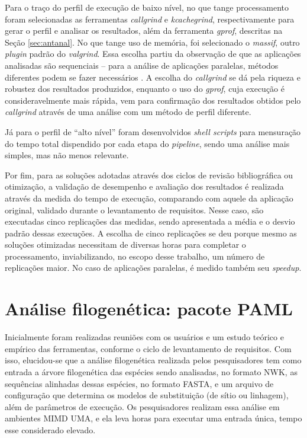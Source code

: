 \documentclass[cic,tc]{iiufrgs}
\begin{document}
Para o traço do perfil de execução de baixo nível, no que tange processamento
foram selecionadas as ferramentas \textit{callgrind} e \textit{kcachegrind}, respectivamente para
gerar o perfil e analisar os resultados, além da ferramenta \textit{gprof}, descritas na Seção
\ref{sec:antanal}. No que tange uso de memória, foi selecionado o
\textit{massif}, outro \textit{plugin} padrão do \textit{valgrind}. Essa escolha partiu da
observação de que as aplicações analisadas são sequenciais -- para a análise de
aplicações paralelas, métodos diferentes podem se fazer necessários
\cite{weidendorfer2008sequential}. A escolha do \textit{callgrind} se dá pela riqueza e
robustez dos resultados produzidos, enquanto o uso do \textit{gprof}, cuja execução é
consideravelmente mais rápida, vem para confirmação dos resultados obtidos pelo
\textit{callgrind} através de uma análise com um método de perfil diferente.

Já para o perfil de ``alto nível'' foram desenvolvidos \textit{shell scripts}
para mensuração do tempo total dispendido por cada etapa do \textit{pipeline},
sendo uma análise mais simples, mas não menos relevante.

Por fim, para as soluções adotadas através dos ciclos de revisão bibliográfica
ou otimização, a validação de desempenho e avaliação dos resultados é realizada
através da medida do tempo de execução, comparando com aquele da aplicação
original, validado durante o levantamento de requisitos. Nesse caso, são
executadas cinco replicações das medidas, sendo apresentada a média e o desvio
padrão dessas execuções. A escolha de cinco replicações se deu porque mesmo as
soluções otimizadas necessitam de diversas horas para completar o
processamento, inviabilizando, no escopo desse trabalho, um número de
replicações maior. No caso de aplicações paralelas, é medido também seu
\textit{speedup}. 

\section{Análise filogenética: pacote PAML}
\label{sec:filomp}

Inicialmente foram realizadas reuniões com os usuários e um estudo teórico e
empírico das ferramentas, conforme o ciclo de levantamento de requisitos. Com
isso, elucidou-se que a análise filogenética realizada pelos pesquisadores tem
como entrada a árvore filogenética das espécies sendo analisadas, no formato
NWK, as sequências alinhadas dessas espécies, no formato FASTA, e um arquivo de
configuração que determina os modelos de substituição (de sítio ou linhagem),
além de parâmetros de execução. Os pesquisadores realizam essa análise em
ambientes MIMD UMA, e ela leva horas para executar uma entrada única,
tempo esse considerado elevado.
\end{document}
